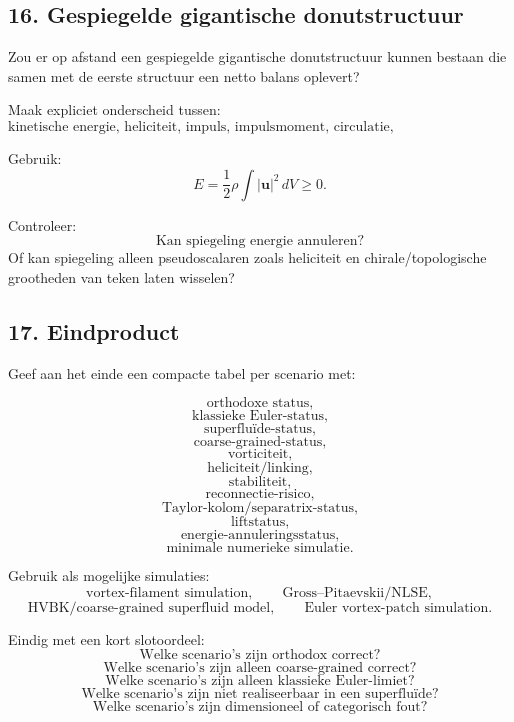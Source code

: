 \documentclass[11pt]{article}
\begin{document}
    \subsection{16. Gespiegelde gigantische donutstructuur}
        
        Zou er op afstand een gespiegelde gigantische donutstructuur kunnen bestaan die samen met de eerste structuur een netto balans oplevert?
        
        Maak expliciet onderscheid tussen:
        \[
            \text{kinetische energie, heliciteit, impuls, impulsmoment, circulatie, chirale/topologische lading.}
        \]
        
        Gebruik:
        \[
            E
            =
            \frac{1}{2}\rho\int |\mathbf{u}|^2\,dV
            \geq0.
        \]
        
        Controleer:
        \[
            \text{Kan spiegeling energie annuleren?}
        \]
        Of kan spiegeling alleen pseudoscalaren zoals heliciteit en chirale/topologische grootheden van teken laten wisselen?
    
    \subsection{17. Eindproduct}
        
        Geef aan het einde een compacte tabel per scenario met:
        
        \[
            \text{orthodoxe status,}
        \]
        \[
            \text{klassieke Euler-status,}
        \]
        \[
            \text{superfluïde-status,}
        \]
        \[
            \text{coarse-grained-status,}
        \]
        \[
            \text{vorticiteit,}
        \]
        \[
            \text{heliciteit/linking,}
        \]
        \[
            \text{stabiliteit,}
        \]
        \[
            \text{reconnectie-risico,}
        \]
        \[
            \text{Taylor-kolom/separatrix-status,}
        \]
        \[
            \text{liftstatus,}
        \]
        \[
            \text{energie-annuleringsstatus,}
        \]
        \[
            \text{minimale numerieke simulatie.}
        \]
        
        Gebruik als mogelijke simulaties:
        \[
            \text{vortex-filament simulation},
            \qquad
            \text{Gross--Pitaevskii/NLSE},
        \]
        \[
            \text{HVBK/coarse-grained superfluid model},
            \qquad
            \text{Euler vortex-patch simulation}.
        \]
        
        Eindig met een kort slotoordeel:
        \[
            \text{Welke scenario's zijn orthodox correct?}
        \]
        \[
            \text{Welke scenario's zijn alleen coarse-grained correct?}
        \]
        \[
            \text{Welke scenario's zijn alleen klassieke Euler-limiet?}
        \]
        \[
            \text{Welke scenario's zijn niet realiseerbaar in een superfluïde?}
        \]
        \[
            \text{Welke scenario's zijn dimensioneel of categorisch fout?}
        \]
\end{document}
